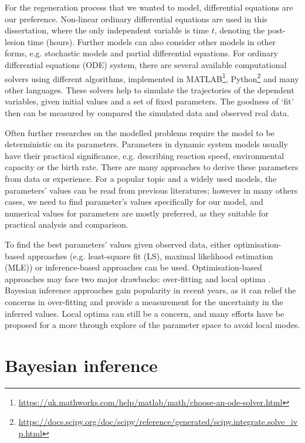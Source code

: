 For the regeneration process that we wanted to model, differential equations are our preference. Non-linear ordinary differential equations are used in this dissertation, where the only independent variable is time $t$, denoting the post-lesion time (hours). Further models can also consider other models in other forms, e.g. stochastic models and partial differential equations. For ordinary differential equations (ODE) system, there are several available computational solvers using different algorithms, implemented in MATLAB\footnote[1] {\url{https://uk.mathworks.com/help/matlab/math/choose-an-ode-solver.html}}, Python\footnote[2]{\url{https://docs.scipy.org/doc/scipy/reference/generated/scipy.integrate.solve_ivp.html}} and many other languages. These solvers help to simulate the trajectories of the dependent variables, given initial values and a set of fixed parameters. The goodness of `fit' then can be measured by compared the simulated data and observed real data.

Often further researches on the modelled problems require the model to be deterministic on its parameters. Parameters in dynamic system models usually have their practical significance, e.g. describing reaction speed, environmental capacity or the birth rate. There are many approaches to derive these parameters from data or experience. For a popular topic and a widely used models, the parameters' values can be read from previous literatures; however in many others cases, we need to find parameter's values specifically for our model, and numerical values for parameters are mostly preferred, as they suitable for practical analysis and comparison.

To find the best parameters' values given observed data, either optimisation-based approaches (e.g. least-square fit (LS), maximal likelihood estimation (MLE)) or inference-based approaches can be used. Optimisation-based approaches may face two major drawbacks: over-fitting and local optima \cite{ref:abcsysbio}. Bayesian inference approaches gain popularity in recent years, as it can relief the concerns in over-fitting and provide a measurement for the uncertainty in the inferred values. Local optima can still be a concern, and many efforts have be proposed for a more through explore of the parameter space to avoid local modes.



\section{Bayesian inference}

